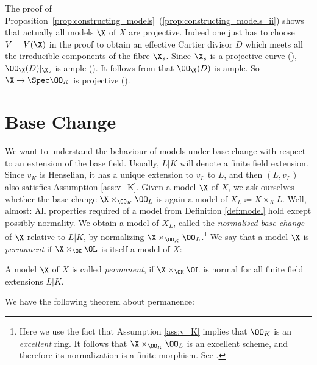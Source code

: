 \begin{remark}
    The proof of Proposition~\ref{prop:constructing_models}~(\ref{prop:constructing_models_ii}) shows that actually all models
    $\X$ of $X$ are projective.
    Indeed one just has to choose $V = V(\X)$ in the proof to obtain an effective Cartier divisor $D$ which meets
    all the irreducible components of the fibre $\X_s$.
    Since $\X_s$ is a projective curve (\cite[Exercise 7.5.4]{Liu}), $\OO_\X(D)|_{\X_s}$ is ample (\cite[Proposition 7.5.5]{Liu}).
    It follows from \cite[Corollary 5.3.24]{Liu} that $\OO_\X(D)$ is ample.
    So $\X \to \Spec \OO_K$ is projective (\cite[Proposition 5.3.6]{Liu}).
\end{remark}


\section{Base Change}\label{sec:base-change}

We want to understand the behaviour of models under base change with respect to an extension of the base field.
Usually, $L|K$ will denote a finite field extension.
Since $v_K$ is Henselian, it has a unique extension to $v_L$ to $L$, and then $(L,v_L)$ also satisfies Assumption \ref{ass:v_K}.
Given a model $\X$ of $X$, we ask ourselves whether the base change $\X\times_{\OO_K}\OO_L$ is again a model of $X_L \coloneqq X\times_K L$.
Well, almost: All properties required of a model from Definition \ref{def:model} hold except possibly normality.
We obtain a model of $X_L$, called the {\em normalised base change} of $\X$ relative to $L|K$, by normalizing $\X\times_{\OO_K}\OO_L$.\footnote{
    Here we use the fact that Assumption \ref{ass:v_K} implies that $\OO_K$ is an \emph{excellent} ring.
    It follows that $\X\times_{\OO_K}\OO_L$ is an excellent scheme, and therefore its normalization is a finite morphism.
    See \cite[Chapter 8, in particular Theorem 8.2.39 (d)]{Liu}.
}
We say that a model $\X$ is \textit{permanent} if $\X \times_{\OK}\OL$ is itself a model of $X$:

\begin{definition} \label{def:permanent-model}
    A model $\X$ of $X$ is called \textit{permanent}, if $\X \times_{\OK} \OL$ is normal for all finite field extensions $L|K$.
\end{definition}

We have the following theorem about permanence:

